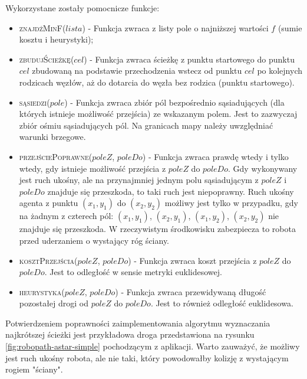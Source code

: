 Wykorzystane zostały pomocnicze funkcje:
\begin{itemize}
	\item \textsc{znajdźMinF}($lista$) - Funkcja zwraca z listy pole o najniższej wartości $f$ (sumie kosztu i heurystyki);
	\item \textsc{zbudujŚcieżkę}($cel$) - Funkcja zwraca ścieżkę z punktu startowego do punktu $cel$ zbudowaną na podstawie przechodzenia wstecz od punktu $cel$ po kolejnych rodzicach węzłów, aż do dotarcia do węzła bez rodzica (punktu startowego).
	\item \textsc{sąsiedzi}($pole$) - Funkcja zwraca zbiór pól bezpośrednio sąsiadujących (dla których istnieje możliwość przejścia) ze wskazanym polem. Jest to zazwyczaj zbiór ośmiu sąsiadujących pól. Na granicach mapy należy uwzględniać warunki brzegowe.
	\item \textsc{przejściePoprawne}($poleZ$, $poleDo$) - Funkcja zwraca prawdę wtedy i tylko wtedy, gdy istnieje możliwość przejścia z $poleZ$ do $poleDo$. Gdy wykonywany jest ruch ukośny, ale na przynajmniej jednym polu sąsiadującym z $poleZ$ i $poleDo$ znajduje się przeszkoda, to taki ruch jest niepoprawny. Ruch ukośny agenta z punktu $(x_1, y_1)$ do $(x_2, y_2)$ możliwy jest tylko w przypadku, gdy na żadnym z czterech pól: $(x_1, y_1)$, $(x_2, y_1)$, $(x_1, y_2)$, $(x_2, y_2)$ nie znajduje się przeszkoda. W rzeczywistym środkowisku zabezpiecza to robota przed uderzaniem o wystający róg ściany.
	\item \textsc{kosztPrzejścia}($poleZ$, $poleDo$) - Funkcja zwraca koszt przejścia z $poleZ$ do $poleDo$. Jest to odległość w sensie metryki euklidesowej.
	\item \textsc{heurystyka}($poleZ$, $poleDo$) - Funkcja zwraca przewidywaną długość pozostałej drogi od $poleZ$ do $poleDo$. Jest to również odległość euklidesowa.
\end{itemize}

Potwierdzeniem poprawności zaimplementowania algorytmu wyznaczania najkrótszej ścieżki jest przykładowa droga przedstawiona na rysunku \ref{fig:robopath-astar-simple} pochodzącym z aplikacji. Warto zauważyć, że możliwy jest ruch ukośny robota, ale nie taki, który powodowałby kolizję z wystającym rogiem "ściany".

